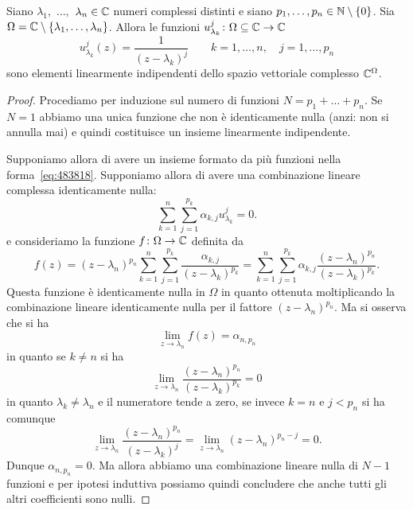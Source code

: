 \begin{lemma}
\label{lemma:72995}
Siano $\lambda_1,$ $\dots,$ $\lambda_n \in \mathbb C$ numeri complessi
distinti e siano $p_1,\dots,p_n \in \mathbb N\setminus{\left\{ 0 \right\}}$.
Sia $\Omega = \mathbb C \setminus {\left\{ \lambda_1, \dots, \lambda_n \right\}}$.
Allora le funzioni
$u_{\lambda_k}^{j}\colon \Omega\subseteq \mathbb C \to \mathbb C$
\begin{equation}
\label{eq:483818}
  u_{\lambda_k}^{j}(z) = \frac{1}{(z-\lambda_k)^{j}}
  \qquad k=1,\dots,n, \quad j=1,\dots, p_n
\end{equation}
sono elementi linearmente indipendenti dello spazio
vettoriale complesso $\mathbb C^\Omega$.
\end{lemma}
%
\begin{proof}
Procediamo per induzione sul numero di funzioni
$N=p_1+ \dots + p_n$.
Se $N=1$ abbiamo una unica funzione che non è identicamente
nulla (anzi: non si annulla mai)
e quindi costituisce un insieme linearmente indipendente.

Supponiamo allora di avere un insieme formato da più funzioni
nella forma~\eqref{eq:483818}.
Supponiamo allora di avere
una combinazione lineare complessa identicamente nulla:
\[
\sum_{k=1}^n \sum_{j=1}^{p_k} \alpha_{k,j} u_{\lambda_k}^j = 0.
\]
e consideriamo la funzione $f\colon \Omega \to \mathbb C$
definita da
\begin{equation}
\label{eq:567384}
  f(z)
  = (z-\lambda_n)^{p_n}\sum_{k=1}^n \sum_{j=1}^{p_k} \frac{\alpha_{k,j}}{(z-\lambda_k)^{p_k}}
  = \sum_{k=1}^n \sum_{j=1}^{p_k} \alpha_{k,j}\frac{(z-\lambda_n)^{p_n}}{(z-\lambda_k)^{p_k}}.
\end{equation}
Questa funzione è identicamente nulla
in $\Omega$ in quanto ottenuta moltiplicando la combinazione lineare identicamente
nulla per il fattore $(z-\lambda_n)^{p_n}$.
Ma si osserva che si ha
\[
  \lim_{z\to \lambda_n} f(z) = \alpha_{n,p_n}
\]
in quanto se $k\neq n$ si ha
\[
\lim_{z\to \lambda_n}\frac{(z-\lambda_n)^{p_n}}{(z-\lambda_k)^{p_k}} = 0
\]
in quanto $\lambda_k\neq \lambda_n$ e il numeratore
tende a zero, se invece $k=n$ e $j<p_n$ si ha comunque
\[
\lim_{z\to \lambda_n}\frac{(z-\lambda_n)^{p_n}}{(z-\lambda_k)^{j}}
= \lim_{z\to \lambda_n}(z-\lambda_n)^{p_n-j} = 0.
\]
Dunque $\alpha_{n,p_n}=0$.
Ma allora abbiamo una combinazione lineare nulla di $N-1$
funzioni e per ipotesi induttiva possiamo quindi concludere
che anche tutti gli altri coefficienti sono nulli.
\end{proof}

